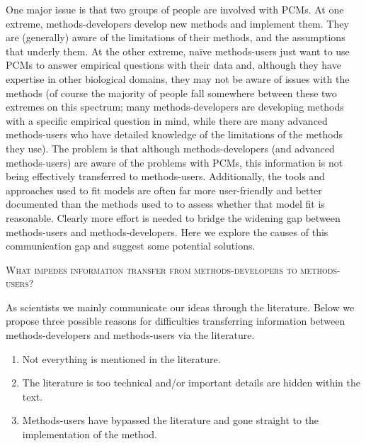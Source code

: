 \documentclass[a4paper,12pt]{article}
\renewcommand{\section}[1]{
  \bigskip
  \begin{center}
  \begin{Large}
  \normalfont\scshape #1
  \medskip
  \end{Large}
  \end{center}
}
\begin{document}
One major issue is that two groups of people are involved with PCMs. 
At one extreme, methods-developers develop new methods and implement them. They are (generally) aware of the limitations of their methods, and the assumptions that underly them. 
At the other extreme, na\"{i}ve methods-users just want to use PCMs to answer empirical questions with their data and, although they have expertise in other biological domains, they may not be aware of issues with the methods (of course the majority of people fall somewhere between these two extremes on this spectrum; many methods-developers are developing methods with a specific empirical question in mind, while there are many advanced methods-users who have detailed knowledge of the limitations of the methods they use). 
The problem is that although methods-developers (and advanced methods-users) are aware of the problems with PCMs, this information is not being effectively transferred to methods-users. 
Additionally, the tools and approaches used to fit models are often far more user-friendly and better documented than the methods used to to assess whether that model fit is reasonable. 
Clearly more effort is needed to bridge the widening gap between methods-users and methods-developers. Here we explore the causes of this communication gap and suggest some potential solutions. %

\section{What impedes information transfer from methods-developers to methods-users?}
As scientists we mainly communicate our ideas through the literature. 
Below we propose three possible reasons for difficulties transferring information between methods-developers and methods-users via the literature.

\begin{enumerate}
\item Not everything is mentioned in the literature.
\item The literature is too technical and/or important details are hidden within the text.
\item Methods-users have bypassed the literature and gone straight to the implementation of the method.
\end{enumerate}
\end{document}
